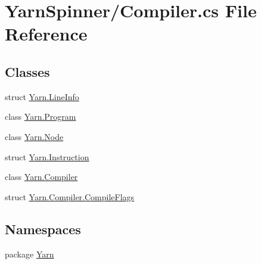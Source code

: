 \hypertarget{a00261}{\section{Yarn\-Spinner/\-Compiler.cs File Reference}
\label{a00261}
}
\subsection*{Classes}
\begin{DoxyCompactItemize}
\item 
struct \hyperlink{a00103}{Yarn.\-Line\-Info}
\item 
class \hyperlink{a00124}{Yarn.\-Program}
\item 
class \hyperlink{a00029_da/de0/a00317}{Yarn.\-Node}
\item 
struct \hyperlink{a00093}{Yarn.\-Instruction}
\item 
class \hyperlink{a00032}{Yarn.\-Compiler}
\item 
struct \hyperlink{a00032_dd/db3/a00313}{Yarn.\-Compiler.\-Compile\-Flags}
\end{DoxyCompactItemize}
\subsection*{Namespaces}
\begin{DoxyCompactItemize}
\item 
package \hyperlink{a00029}{Yarn}
\end{DoxyCompactItemize}
